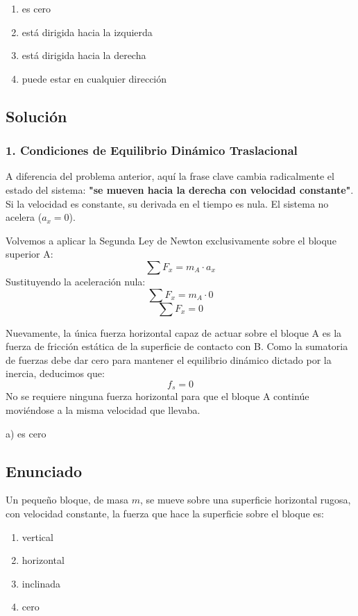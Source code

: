 \documentclass[12pt, a4paper]{article}
\begin{document}
\begin{enumerate}[label=\alph*)]
    \item es cero
    \item está dirigida hacia la izquierda
    \item está dirigida hacia la derecha
    \item puede estar en cualquier dirección
\end{enumerate}

\subsection*{Solución}

\subsubsection*{1. Condiciones de Equilibrio Dinámico Traslacional}
A diferencia del problema anterior, aquí la frase clave cambia radicalmente el estado del sistema: \textbf{"se mueven hacia la derecha con velocidad constante"}.
Si la velocidad es constante, su derivada en el tiempo es nula. El sistema no acelera ($a_x = 0$).

Volvemos a aplicar la Segunda Ley de Newton exclusivamente sobre el bloque superior A:
$$ \sum F_x = m_A \cdot a_x $$
Sustituyendo la aceleración nula:
$$ \sum F_x = m_A \cdot 0 $$
$$ \sum F_x = 0 $$

Nuevamente, la única fuerza horizontal capaz de actuar sobre el bloque A es la fuerza de fricción estática de la superficie de contacto con B. Como la sumatoria de fuerzas debe dar cero para mantener el equilibrio dinámico dictado por la inercia, deducimos que:
$$ f_s = 0 $$
No se requiere ninguna fuerza horizontal para que el bloque A continúe moviéndose a la misma velocidad que llevaba. 

\begin{tcolorbox}[colback=green!5!white, colframe=green!50!black, title=Respuesta Final]
\centering \Large a) es cero
\end{tcolorbox}

\newpage

\subsection*{Enunciado}
Un pequeño bloque, de masa $m$, se mueve sobre una superficie horizontal rugosa, con velocidad constante, la fuerza que hace la superficie sobre el bloque es:
\begin{enumerate}[label=\alph*)]
    \item vertical
    \item horizontal
    \item inclinada
    \item cero
\end{enumerate}
\end{document}
